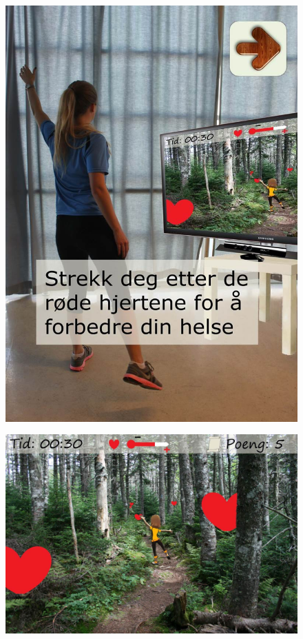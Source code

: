 \begin{figure} [H]
\centering
\includegraphics[scale=0.7]{KineIntro.jpg}
\label{fig:kineintroNorsk}
\end{figure}

\begin{figure} [H]
\centering
\includegraphics[scale=0.5]{hjerter.jpg}
\label{fig:heartsNorsk}
\end{figure}

